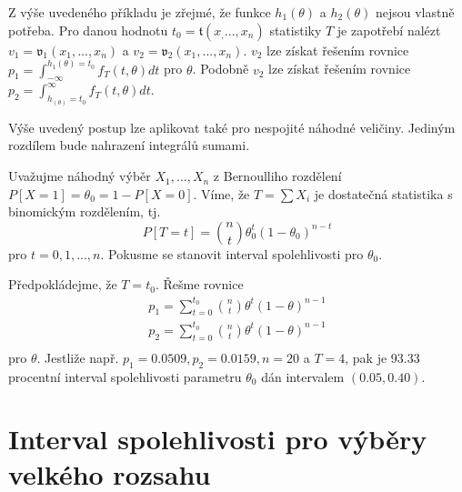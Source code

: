 Z výše uvedeného příkladu je zřejmé, že funkce $h_1(\theta)$ a $h_2(\theta)$ nejsou vlastně potřeba. Pro danou hodnotu $t_0 = \mathfrak{t}(x_, ..., x_n)$ statistiky $T$ je zapotřebí nalézt $v_1 = \mathfrak{v}_1(x_1, ..., x_n)$ a  $v_2 = \mathfrak{v}_2(x_1, ..., x_n)$. $v_2$ lze získat řešením rovnice $p_1 = \int_{-\infty}^{h_1(\theta) = t_0} f_T(t, \theta) dt$ pro $\theta$. Podobně $v_2$ lze získat řešením rovnice $p_2 = \int_{h_(\theta) = t_0}^{\infty}f_T(t, \theta)dt$.

Výše uvedený postup lze aplikovat také pro nespojité náhodné veličiny. Jediným rozdílem bude nahrazení integrálů sumami.

\begin{example}
Uvažujme náhodný výběr $X_1, ..., X_n$ z Bernoulliho rozdělení $P[X = 1] = \theta_0 = 1 - P[X = 0]$. Víme, že $T = \sum X_i$ je dostatečná statistika s binomickým rozdělením, tj.
\begin{equation*}
P[T = t] = \binom{n}{t} \theta_0^t (1 - \theta_0)^{n - t}
\end{equation*}
pro $t = 0, 1, ..., n$. Pokusme se stanovit interval spolehlivosti pro $\theta_0$.

Předpokládejme, že $T = t_0$. Řešme rovnice
\begin{gather*}
p_1 = \sum_{t = 0}^{t_0} \binom{n}{t}\theta^t(1 - \theta)^{n - 1}\\
p_2 = \sum_{t = 0}^{t_0} \binom{n}{t}\theta^t(1 - \theta)^{n - 1}\\
\end{gather*}
pro $\theta$. Jestliže např. $p_1 = 0.0509, p_2 = 0.0159, n = 20$ a $T = 4$, pak je 93.33 procentní interval spolehlivosti parametru $\theta_0$ dán intervalem $(0.05, 0.40)$.
\end{example}

\section{Interval spolehlivosti pro výběry velkého rozsahu}

